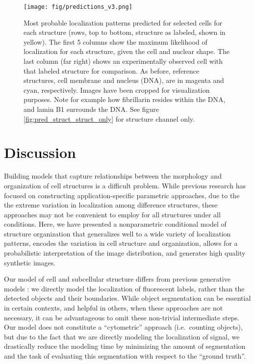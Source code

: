 \documentclass[accepted]{article}
\begin{document}
\begin{figure}[htbp]
\centering
\texttt{[image: fig/predictions\_v3.png]}
\caption{Most probable localization patterns predicted for selected cells for each structure (rows, top to bottom, structure as labeled, shown in yellow).
The first 5 columns show the maximum likelihood of localization for each structure, given the cell and nuclear shape.
The last column (far right) shows an experimentally observed cell with that labeled structure for comparison.
As before, reference structures, cell membrane and nucleus (DNA), are in magenta and cyan, respectively.
Images have been cropped for visualization purposes.
Note for example how fibrillarin resides within the DNA, and lamin B1 surrounds the DNA.
See figure \ref{fig:pred_struct_struct_only} for structure channel only.}
\label{fig:pred_struct}
\end{figure}


\section{Discussion}
\label{discussion}

Building models that capture relationships between the morphology and organization of cell structures is a difficult problem.
While previous research has focused on constructing application-specific parametric approaches, due to the the extreme variation in localization among difference structures, these approaches may not be convenient to employ for all structures under all conditions.
Here, we have presented a nonparametric conditional model of structure organization that generalizes well to a wide variety of localization patterns, encodes the variation in cell structure and organization, allows for a probabilistic interpretation of the image distribution, and generates high quality synthetic images.

Our model of cell and subcellular structure differs from previous generative models \cite{Zhao:2007is,Peng:2011et,Johnson:2015bz}: we directly model the localization of fluorescent labels, rather than the detected objects and their boundaries.
While object segmentation can be essential in certain contexts, and helpful in others, when these approaches are not necessary, it can be advantageous to omit these non-trivial intermediate steps.
Our model does not constitute a ``cytometric'' approach (i.e.\ counting objects), but due to the fact that we are directly modeling the localization of signal, we drastically reduce the modeling time by minimizing the amount of segmentation and the task of evaluating this segmentation with respect to the ``ground truth''.
\end{document}
